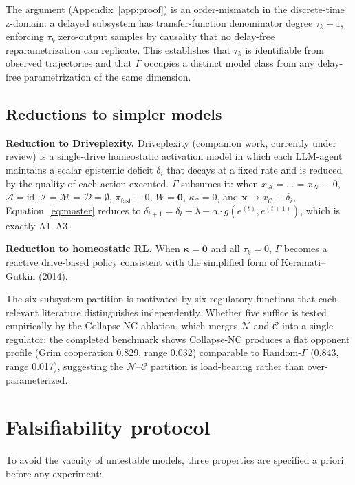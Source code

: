 \documentclass{article}
\begin{document}
The argument (Appendix~\ref{app:proof}) is an order-mismatch in the discrete-time z-domain: a delayed subsystem has transfer-function denominator degree $\tau_k+1$, enforcing $\tau_k$ zero-output samples by causality that no delay-free reparametrization can replicate. This establishes that $\tau_k$ is identifiable from observed trajectories and that $\Gamma$ occupies a distinct model class from any delay-free parametrization of the same dimension.

\subsection{Reductions to simpler models}

\textbf{Reduction to Driveplexity.} Driveplexity (companion work, currently under review) is a single-drive homeostatic activation model in which each LLM-agent maintains a scalar epistemic deficit $\delta_i$ that decays at a fixed rate and is reduced by the quality of each action executed. $\Gamma$ subsumes it: when $x_{\mathcal{A}} = \dots = x_{\mathcal{N}} \equiv 0$, $\mathcal{A}=\text{id}$, $\mathcal{I}=\mathcal{M}=\mathcal{D}=\emptyset$, $\pi_{\text{fast}}\equiv 0$, $W=\mathbf{0}$, $\kappa_{\mathcal{C}}=0$, and $\mathbf{x} \to x_{\mathcal{C}} \equiv \delta_i$, Equation~\eqref{eq:master} reduces to $\delta_{t+1} = \delta_t + \lambda - \alpha \cdot g(e^{(t)}, e^{(t+1)})$, which is exactly A1--A3.

\textbf{Reduction to homeostatic RL.} When $\boldsymbol{\kappa}=\mathbf{0}$ and all $\tau_k=0$, $\Gamma$ becomes a reactive drive-based policy consistent with the simplified form of Keramati--Gutkin (2014).

The six-subsystem partition is motivated by six regulatory functions that each relevant literature distinguishes independently. Whether five suffice is tested empirically by the Collapse-NC ablation, which merges $\mathcal{N}$ and $\mathcal{C}$ into a single regulator: the completed benchmark shows Collapse-NC produces a flat opponent profile (Grim cooperation 0.829, range 0.032) comparable to Random-$\Gamma$ (0.843, range 0.017), suggesting the $\mathcal{N}$--$\mathcal{C}$ partition is load-bearing rather than over-parameterized.

\section{Falsifiability protocol}

To avoid the vacuity of untestable models, three properties are specified a priori before any experiment:
\end{document}
